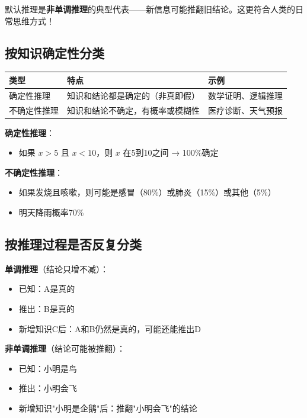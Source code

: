 \begin{tipbox}
默认推理是\textbf{非单调推理}的典型代表——新信息可能推翻旧结论。这更符合人类的日常思维方式！
\end{tipbox}

\subsection{按知识确定性分类}

\begin{table}[htbp]
\centering\small
\begin{tabular}{lll}
\toprule
\textbf{类型} & \textbf{特点} & \textbf{示例} \\
\midrule
确定性推理 & 知识和结论都是确定的（非真即假） & 数学证明、逻辑推理 \\
不确定性推理 & 知识和结论不确定，有概率或模糊性 & 医疗诊断、天气预报 \\
\bottomrule
\end{tabular}
\end{table}

\begin{examplebox}
\textbf{确定性推理}：
\begin{itemize}[itemsep=0pt]
    \item 如果 $x > 5$ 且 $x < 10$，则 $x$ 在5到10之间 → 100\%确定
\end{itemize}

\textbf{不确定性推理}：
\begin{itemize}[itemsep=0pt]
    \item 如果发烧且咳嗽，则可能是感冒（80\%）或肺炎（15\%）或其他（5\%）
    \item 明天降雨概率70\%
\end{itemize}
\end{examplebox}

\subsection{按推理过程是否反复分类}

\begin{examplebox}
\textbf{单调推理}（结论只增不减）：
\begin{itemize}[itemsep=0pt]
    \item 已知：A是真的
    \item 推出：B是真的
    \item 新增知识C后：A和B仍然是真的，可能还能推出D
\end{itemize}

\textbf{非单调推理}（结论可能被推翻）：
\begin{itemize}[itemsep=0pt]
    \item 已知：小明是鸟
    \item 推出：小明会飞
    \item 新增知识"小明是企鹅"后：推翻"小明会飞"的结论
\end{itemize}
\end{examplebox}


